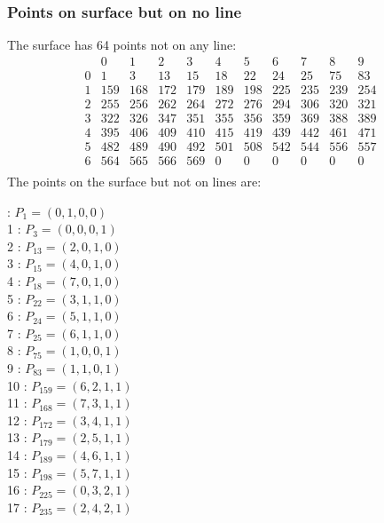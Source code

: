 \documentclass{article}
\begin{document}
{\subsubsection*{Points on surface but on no line}
The surface has 64 points not on any line:\\
$$
\begin{array}{r|*{10}{r}}
 & 0 & 1 & 2 & 3 & 4 & 5 & 6 & 7 & 8 & 9\\
\hline
0 & 1 & 3 & 13 & 15 & 18 & 22 & 24 & 25 & 75 & 83\\
1 & 159 & 168 & 172 & 179 & 189 & 198 & 225 & 235 & 239 & 254\\
2 & 255 & 256 & 262 & 264 & 272 & 276 & 294 & 306 & 320 & 321\\
3 & 322 & 326 & 347 & 351 & 355 & 356 & 359 & 369 & 388 & 389\\
4 & 395 & 406 & 409 & 410 & 415 & 419 & 439 & 442 & 461 & 471\\
5 & 482 & 489 & 490 & 492 & 501 & 508 & 542 & 544 & 556 & 557\\
6 & 564 & 565 & 566 & 569 & 0 & 0 & 0 & 0 & 0 & 0\\
\end{array}
$$
The points on the surface but not on lines are:\\
\begin{multicols}{2}
 : $P_{1}=( 0, 1, 0, 0 )$\\
1 : $P_{3}=( 0, 0, 0, 1 )$\\
2 : $P_{13}=( 2, 0, 1, 0 )$\\
3 : $P_{15}=( 4, 0, 1, 0 )$\\
4 : $P_{18}=( 7, 0, 1, 0 )$\\
5 : $P_{22}=( 3, 1, 1, 0 )$\\
6 : $P_{24}=( 5, 1, 1, 0 )$\\
7 : $P_{25}=( 6, 1, 1, 0 )$\\
8 : $P_{75}=( 1, 0, 0, 1 )$\\
9 : $P_{83}=( 1, 1, 0, 1 )$\\
10 : $P_{159}=( 6, 2, 1, 1 )$\\
11 : $P_{168}=( 7, 3, 1, 1 )$\\
12 : $P_{172}=( 3, 4, 1, 1 )$\\
13 : $P_{179}=( 2, 5, 1, 1 )$\\
14 : $P_{189}=( 4, 6, 1, 1 )$\\
15 : $P_{198}=( 5, 7, 1, 1 )$\\
16 : $P_{225}=( 0, 3, 2, 1 )$\\
17 : $P_{235}=( 2, 4, 2, 1 )$\\

\end{multicols}}
\end{document}
